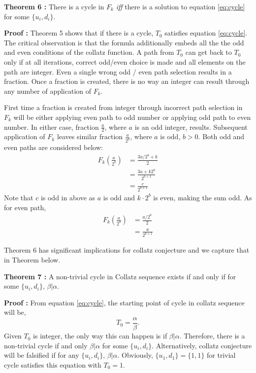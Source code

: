 \documentclass[12pt]{article} %
\begin{document}
\textbf{Theorem 6 :}
There is a cycle in $F_k$ \textit{iff} there is a solution to equation \eqref{eq:cycle} for some $\{u_i,d_i\}$.

\textbf{Proof :}
Theorem 5 shows that if there is a cycle, $T_0$ satisfies equation \eqref{eq:cycle}. The critical observation is that the formula additionally embeds all the the odd and even conditions of the collatz function. A path from $T_0$ can get back to $T_0$ only if at all iterations, correct odd/even choice is made and all elements on the path are integer. Even a single wrong odd / even path selection results in a fraction. Once a fraction is created, there is no way an integer can result through any number of application of $F_k$. 

First time a fraction is created from integer through incorrect path selection in $F_k$ will be either applying even path to odd number or applying odd path to even number. In either case, fraction $\frac{a}{2}$, where $a$ is an odd integer, results. Subsequent application of $F_k$ leaves similar fraction $\frac{a}{2^b}$, where $a$ is odd, $b > 0$. Both odd and even paths are considered below:
\begin{align*}
    F_k(\frac{a}{2^b})  & = \frac{3a/2^b + k}{2} \\
                        & = \frac{3a + k 2^b}{2^{b+1}}\\
                        & = \frac{c}{2^{b+1}}
\end{align*}
Note that $c$ is odd in above as $a$ is odd and $k \cdot 2^b$ is even, making the sum odd. As for even path, 
\begin{align*}
   F_k( \frac{a}{2^b}) & = \frac{a/2^b}{2}\\
                      & = \frac{a}{2^{b+1}}
\end{align*}

Theorem 6 has significant implications for collatz conjecture and we capture that in Theorem below.
\newline

\textbf{Theorem 7 :}
A non-trivial cycle in Collatz sequence exists if and only if for some $\{u_i, d_i\}$, $\beta \vert \alpha$. 

\textbf{Proof :}
From equation \eqref{eq:cycle}, the starting point of cycle in collatz sequence will be, 
\[ 
T_0 = \frac{\alpha}{\beta}.
\]
Given $T_0$ is integer, the only way this can happen is if $\beta  \vert \alpha$. Therefore, there is a non-trivial cycle if and only $\beta \vert \alpha$ for some $\{u_i, d_i\}$. Alternatively, collatz conjecture will be falsified if for any $\{u_i, d_i\}$, $\beta \vert \alpha$. Obviously, $\{u_1, d_1\} = \{1,1\}$ for trivial cycle satisfies this equation with $T_0 = 1$.
\newline
\end{document}
